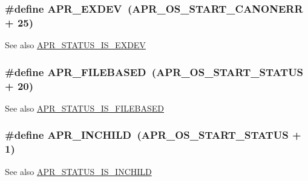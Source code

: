 \subsubsection[{\texorpdfstring{A\+P\+R\+\_\+\+E\+X\+D\+EV}{APR_EXDEV}}]{\setlength{\rightskip}{0pt plus 5cm}\#define A\+P\+R\+\_\+\+E\+X\+D\+EV~({\bf A\+P\+R\+\_\+\+O\+S\+\_\+\+S\+T\+A\+R\+T\+\_\+\+C\+A\+N\+O\+N\+E\+RR} + 25)}\hypertarget{group___a_p_r___error_ga0562023bd8ebe580b9bbb9f7b04d3f5d}{}\label{group___a_p_r___error_ga0562023bd8ebe580b9bbb9f7b04d3f5d}
\begin{DoxySeeAlso}{See also}
\hyperlink{group___a_p_r___s_t_a_t_u_s___i_s_gacc904a0533b6111e1399e56120effaff}{A\+P\+R\+\_\+\+S\+T\+A\+T\+U\+S\+\_\+\+I\+S\+\_\+\+E\+X\+D\+EV} 
\end{DoxySeeAlso}
\subsubsection[{\texorpdfstring{A\+P\+R\+\_\+\+F\+I\+L\+E\+B\+A\+S\+ED}{APR_FILEBASED}}]{\setlength{\rightskip}{0pt plus 5cm}\#define A\+P\+R\+\_\+\+F\+I\+L\+E\+B\+A\+S\+ED~({\bf A\+P\+R\+\_\+\+O\+S\+\_\+\+S\+T\+A\+R\+T\+\_\+\+S\+T\+A\+T\+US} + 20)}\hypertarget{group___a_p_r___error_ga28a6d59b62d2698208451a9343399fbb}{}\label{group___a_p_r___error_ga28a6d59b62d2698208451a9343399fbb}
\begin{DoxySeeAlso}{See also}
\hyperlink{group___a_p_r___s_t_a_t_u_s___i_s_gad8c919d5fa82fcf83bf9e2c911e323f9}{A\+P\+R\+\_\+\+S\+T\+A\+T\+U\+S\+\_\+\+I\+S\+\_\+\+F\+I\+L\+E\+B\+A\+S\+ED} 
\end{DoxySeeAlso}
\subsubsection[{\texorpdfstring{A\+P\+R\+\_\+\+I\+N\+C\+H\+I\+LD}{APR_INCHILD}}]{\setlength{\rightskip}{0pt plus 5cm}\#define A\+P\+R\+\_\+\+I\+N\+C\+H\+I\+LD~({\bf A\+P\+R\+\_\+\+O\+S\+\_\+\+S\+T\+A\+R\+T\+\_\+\+S\+T\+A\+T\+US} + 1)}\hypertarget{group___a_p_r___error_ga5a2bb63099778699feeae9627474c179}{}\label{group___a_p_r___error_ga5a2bb63099778699feeae9627474c179}
\begin{DoxySeeAlso}{See also}
\hyperlink{group___a_p_r___s_t_a_t_u_s___i_s_gaf156073c5a8edd2db167258f299a75cd}{A\+P\+R\+\_\+\+S\+T\+A\+T\+U\+S\+\_\+\+I\+S\+\_\+\+I\+N\+C\+H\+I\+LD} 
\end{DoxySeeAlso}
